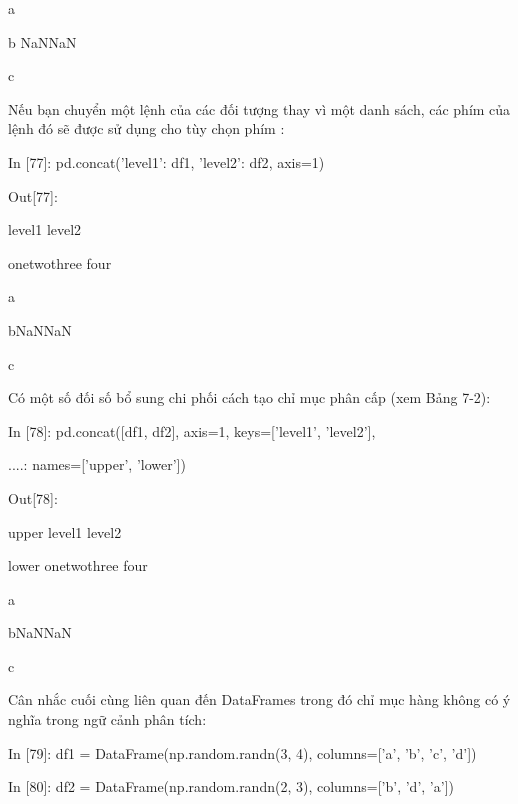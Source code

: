 \par\quad\textup a \quad\quad\quad{}\quad\quad\quad{}\quad\quad\quad{}\quad\quad\quad{}
\par\quad\textup b \quad\quad\quad{} \quad\quad\quad{}\quad\quad\quad\quad  NaN\quad\quad  NaN
\par\quad\textup  c \quad\quad\quad{} \quad\quad\quad{}\quad\quad\quad{}\quad\quad\quad{}
\par\quad\textup Nếu bạn chuyển một lệnh của các đối tượng thay vì một danh sách, các phím của lệnh đó sẽ được sử dụng cho tùy
chọn phím :
\par\quad\textup In [77]: pd.concat({'level1': df1, 'level2': df2}, axis=1)
\par\quad\textup Out[77]:
\par\quad\textup\quad\quad level1 level2
\par\quad\textup\quad\quad one\quad two\quad three \quad four
\par\quad\textup a\quad{}\quad{}  \quad\quad{}
\par\quad\textup b\quad{}\quad{}\quad NaN\quad\quad NaN
\par\quad\textup c\quad{}\quad{}  \quad \quad{}
\par\quad\textup Có một số đối số bổ sung chi phối cách tạo chỉ mục phân cấp (xem Bảng 7-2):
\par\quad\textup In [78]: pd.concat([df1, df2], axis=1, keys=['level1', 'level2'],
\par\quad\textup ....: \quad\quad names=['upper', 'lower'])
\par\quad\textup Out[78]:
\par\quad\textup upper level1 level2
\par\quad\textup lower one\quad two\quad three \quad four
\par\quad\textup a\quad{}\quad{}  \quad\quad{}
\par\quad\textup b\quad{}\quad{}\quad NaN\quad\quad NaN
\par\quad\textup c\quad{}\quad{}  \quad \quad{}
\par Cân nhắc cuối cùng liên quan đến DataFrames trong đó chỉ mục hàng không có ý nghĩa trong ngữ cảnh phân tích:
\par\quad\textup In [79]: df1 = DataFrame(np.random.randn(3, 4), columns=['a', 'b', 'c', 'd'])
\par\quad\textup In [80]: df2 = DataFrame(np.random.randn(2, 3), columns=['b', 'd', 'a'])

